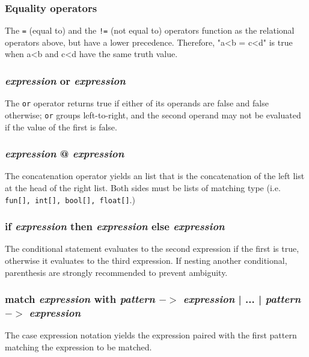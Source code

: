 \begin{alltt}
\quad {} \term{<} 
\quad {} \term{>} 
\quad {} \term{<=} 
\quad {} \term{>=} 
\end{alltt}

\subsubsection{Equality operators}
The \texttt{=} (equal to) and the \texttt{!=} (not equal to) operators function as the relational operators above, but have a lower precedence. Therefore, "a<b = c<d" is true when a<b and c<d have the same truth value.
\\
\begin{alltt}
\quad {} \term{=} 
\quad {} \term{!=} 
\end{alltt}

\subsubsection{\textit{expression} or \textit{expression}}
The \texttt{or} operator returns true if either of its operands are false and false otherwise; \texttt{or} groups left-to-right, and the second operand may not be evaluated if the value of the first is false.


\subsubsection{\textit{expression} @ \textit{expression}} 
The concatenation operator yields an list that is the concatenation of the left list at the head of the right list. Both sides must be lists of matching type (i.e. \texttt{fun[], int[], bool[], float[]}.) 

\subsubsection{if \textit{expression} then \textit{expression} else \textit{expression}}
The conditional statement evaluates to the second expression if the first is true, otherwise it evaluates to the third expression. If nesting another conditional, parenthesis are strongly recommended to prevent ambiguity.

\subsubsection{match \textit{expression} with \textit{pattern} $->$ \textit{expression} | ... | \textit{pattern} $->$ \textit{expression}}
The case expression notation yields the expression paired with the first pattern matching the expression to be matched. 

